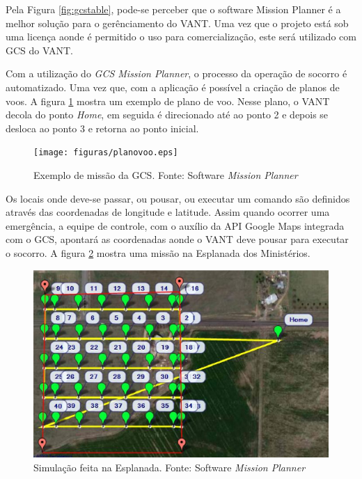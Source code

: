 Pela Figura \ref{fig:gcstable}, pode-se perceber que o software Mission Planner é a melhor solução para o gerênciamento do VANT. Uma vez que o projeto está sob uma licença aonde é permitido o uso para comercialização, este será utilizado com GCS do VANT.

Com a utilização do \textit{GCS Mission Planner}, o processo da operação de socorro é automatizado. 
Uma vez que, com a aplicação é possível a criação de planos de voos. 
A figura \ref{fig:planovoo} mostra um exemplo de plano de voo. 
Nesse plano, o VANT decola do ponto \textit{Home}, em seguida é direcionado até ao ponto 2 e depois 
se desloca ao ponto 3 e retorna ao ponto inicial.

\begin{figure}[H]
    \centering
	    \texttt{[image: figuras/planovoo.eps]}
    \caption{Exemplo de missão da GCS. Fonte: Software \textit{Mission Planner}}
    \label{fig:planovoo}
\end{figure}


Os locais onde deve-se passar, ou pousar, ou executar um comando são definidos através das coordenadas de longitude e latitude. Assim quando ocorrer uma emergência, a equipe de controle, com o auxílio da API Google Maps integrada com o GCS, apontará as coordenadas aonde o VANT deve pousar para executar o socorro. 
A figura \ref{fig:esplanada} mostra uma missão na Esplanada dos Ministérios.

\begin{figure}[H]
    \centering
	    \includegraphics[keepaspectratio=true,scale=0.8]{figuras/esplanada.eps}
    \caption{Simulação feita na Esplanada. Fonte: Software \textit{Mission Planner}}
    \label{fig:esplanada}
\end{figure}

